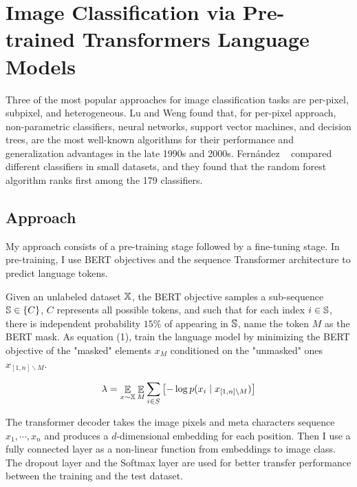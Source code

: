 \documentclass[review]{cvpr}
\begin{document}
\section{Image Classification via Pre-trained Transformers Language Models}

Three of the most popular approaches for image classification tasks are per-pixel, subpixel, and heterogeneous.
Lu and Weng found that, for per-pixel approach, non-parametric classifiers, \eg neural networks, support vector machines, and decision trees,
are the most well-known algorithms for their performance and generalization advantages in the late 1990s and 2000s.
Fern{\'a}ndez \etal~\cite{fernandez2014we} compared different classifiers in small datasets, and they found that the random forest algorithm ranks first among the 179 classifiers.

\subsection{Approach}

My approach consists of a pre-training stage followed by a fine-tuning stage.
In pre-training, I use BERT objectives and the sequence Transformer architecture to predict language tokens.

\par Given an unlabeled dataset $\Bbb X$, the BERT objective samples a sub-sequence $\Bbb S \in \{C\}$,
$C$ represents all possible tokens, and such that for each index $i \in \Bbb S$,
there is independent probability $15\%$ of appearing in $\Bbb S$,
name the token $M$ as the BERT mask.
As equation (1), train the language model by minimizing the BERT objective of the "masked" elements $x_M$
conditioned on the "unmasked" ones $x_{\left[1,n\right]\backslash M}$.

\begin{equation}
  \lambda = \mathop{\Bbb E}\limits_{x\sim\Bbb X} \mathop{\Bbb E}\limits_{M} \sum_{i\in S}{\bigl[-\log{p(x_i\mid x_{\left[1,n \right]\backslash M})\bigr]}}
\end{equation}

\par The transformer decoder takes the image pixels and meta characters sequence $x_1,\cdots,x_n$ and produces a $d$-dimensional
embedding for each position.
Then I use a fully connected layer as a non-linear function from embeddings to image class.
The dropout layer and the Softmax layer are used for better transfer performance between the training and the test dataset.
\end{document}
